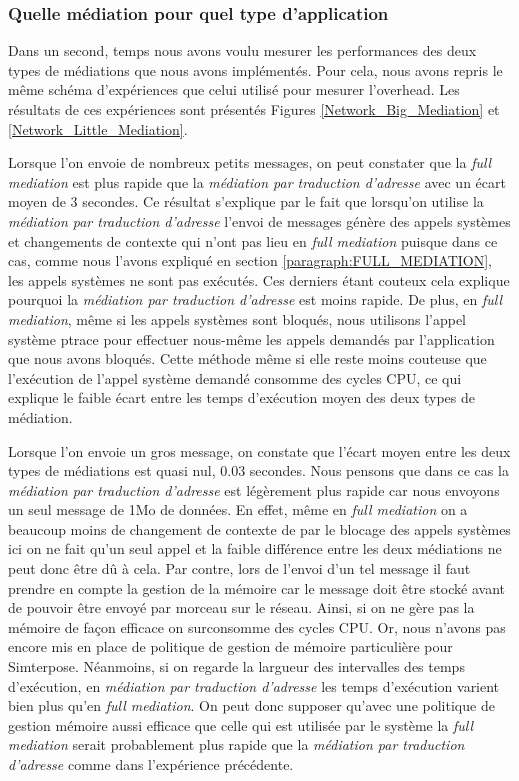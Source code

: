 \subsubsection{Quelle médiation pour quel type d'application}
Dans un second, temps nous avons voulu mesurer les performances des deux types de médiations que nous avons implémentés. Pour cela, nous avons repris le même schéma d'expériences que celui utilisé pour mesurer l'overhead. Les résultats de ces expériences sont présentés Figures \ref{Network_Big_Mediation} et \ref{Network_Little_Mediation}.

Lorsque l'on envoie de nombreux petits messages, on peut constater que la \textit{full mediation} est plus rapide que la \textit{médiation par traduction d'adresse} avec un écart moyen de 3 secondes. Ce résultat s'explique par le fait que lorsqu'on utilise la \textit{médiation par traduction d'adresse} l'envoi de messages génère des appels systèmes et changements de contexte qui n'ont pas lieu en \textit{full mediation} puisque dans ce cas, comme nous l'avons expliqué en section \ref{paragraph:FULL_MEDIATION}, les appels systèmes ne sont pas exécutés. Ces derniers étant couteux cela explique pourquoi la  \textit{médiation par traduction d'adresse} est moins rapide. De plus, en \textit{full mediation}, même si les appels systèmes sont bloqués, nous utilisons l'appel système ptrace pour effectuer nous-même les appels demandés par l'application que nous avons bloqués. Cette méthode même si elle reste moins couteuse que l'exécution de l'appel système demandé consomme des cycles CPU, ce qui explique le faible écart entre les temps d'exécution moyen des deux types de médiation.

Lorsque l'on envoie un gros message, on constate que l'écart moyen entre les deux types de médiations est quasi nul, 0.03 secondes. Nous pensons que dans ce cas la \textit{médiation par traduction d'adresse} est légèrement plus rapide car nous envoyons un seul message de 1Mo de données. En effet, même en \textit{full mediation} on a beaucoup moins de changement de contexte de par le blocage des appels systèmes ici on ne fait qu'un seul appel et la faible différence entre les deux médiations ne peut donc être dû à cela. Par contre, lors de l'envoi d'un tel message il faut prendre en compte la gestion de la mémoire car le message doit être stocké avant de pouvoir être envoyé par morceau sur le réseau. Ainsi, si on ne gère pas la mémoire de façon efficace on surconsomme des cycles CPU. Or, nous n'avons pas encore mis en place de politique de gestion de mémoire particulière pour Simterpose. Néanmoins, si on regarde la largueur des intervalles des temps d'exécution, en \textit{médiation par traduction d'adresse} les temps d'exécution varient bien plus qu'en \textit{full mediation}. On peut donc supposer qu'avec une politique de gestion mémoire aussi efficace que celle qui est utilisée par le système la \textit{full mediation} serait probablement plus rapide que la \textit{médiation par traduction d'adresse} comme dans l'expérience précédente.

